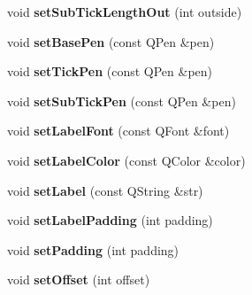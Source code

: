 \begin{DoxyCompactItemize}
\item 
void {\bfseries set\+Sub\+Tick\+Length\+Out} (int outside)\hypertarget{class_q_c_p_axis_a4c6dfc3963492ed72a77724012df5f23}{}\label{class_q_c_p_axis_a4c6dfc3963492ed72a77724012df5f23}

\item 
void {\bfseries set\+Base\+Pen} (const Q\+Pen \&pen)\hypertarget{class_q_c_p_axis_a778d45fb71b3c7ab3bb7079e18b058e4}{}\label{class_q_c_p_axis_a778d45fb71b3c7ab3bb7079e18b058e4}

\item 
void {\bfseries set\+Tick\+Pen} (const Q\+Pen \&pen)\hypertarget{class_q_c_p_axis_ad80923bcc1c5da4c4db602c5325e797e}{}\label{class_q_c_p_axis_ad80923bcc1c5da4c4db602c5325e797e}

\item 
void {\bfseries set\+Sub\+Tick\+Pen} (const Q\+Pen \&pen)\hypertarget{class_q_c_p_axis_aede4028ae7516bd51a60618a8233f9cf}{}\label{class_q_c_p_axis_aede4028ae7516bd51a60618a8233f9cf}

\item 
void {\bfseries set\+Label\+Font} (const Q\+Font \&font)\hypertarget{class_q_c_p_axis_a71ac1a47f7547e490a8c4311d1433cf3}{}\label{class_q_c_p_axis_a71ac1a47f7547e490a8c4311d1433cf3}

\item 
void {\bfseries set\+Label\+Color} (const Q\+Color \&color)\hypertarget{class_q_c_p_axis_a6c906fe56d75f0122335b9f79b999608}{}\label{class_q_c_p_axis_a6c906fe56d75f0122335b9f79b999608}

\item 
void {\bfseries set\+Label} (const Q\+String \&str)\hypertarget{class_q_c_p_axis_a33bcc382c111c9f31bb0687352a2dea4}{}\label{class_q_c_p_axis_a33bcc382c111c9f31bb0687352a2dea4}

\item 
void {\bfseries set\+Label\+Padding} (int padding)\hypertarget{class_q_c_p_axis_a4391192a766e5d20cfe5cbc17607a7a2}{}\label{class_q_c_p_axis_a4391192a766e5d20cfe5cbc17607a7a2}

\item 
void {\bfseries set\+Padding} (int padding)\hypertarget{class_q_c_p_axis_a5691441cb3de9e9844855d339c0db279}{}\label{class_q_c_p_axis_a5691441cb3de9e9844855d339c0db279}

\item 
void {\bfseries set\+Offset} (int offset)\hypertarget{class_q_c_p_axis_a04a652603cbe50eba9969ee6d68873c3}{}\label{class_q_c_p_axis_a04a652603cbe50eba9969ee6d68873c3}


\end{DoxyCompactItemize}
